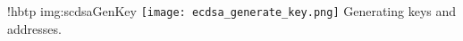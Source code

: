 \namedfigure
{!hbtp}
{img:scdsaGenKey}
{\texttt{[image: ecdsa\_generate\_key.png]}}
{Generating keys and addresses.}
